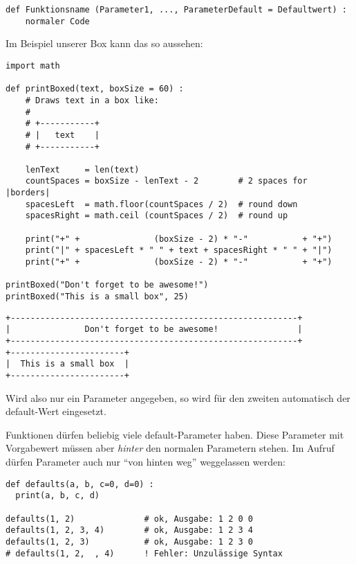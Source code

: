 \begin{codebox}
\begin{verbatim}
def Funktionsname (Parameter1, ..., ParameterDefault = Defaultwert) :
    normaler Code
\end{verbatim}
\end{codebox}

Im Beispiel unserer Box kann das so aussehen:

\begin{codebox}
\begin{verbatim}
import math

def printBoxed(text, boxSize = 60) :
    # Draws text in a box like:
    #
    # +-----------+
    # |   text    |
    # +-----------+
  
    lenText     = len(text)
    countSpaces = boxSize - lenText - 2        # 2 spaces for |borders|
    spacesLeft  = math.floor(countSpaces / 2)  # round down
    spacesRight = math.ceil (countSpaces / 2)  # round up
  
    print("+" +               (boxSize - 2) * "-"           + "+")
    print("|" + spacesLeft * " " + text + spacesRight * " " + "|")
    print("+" +               (boxSize - 2) * "-"           + "+")
  
printBoxed("Don't forget to be awesome!")
printBoxed("This is a small box", 25)
\end{verbatim}
\end{codebox}
\begin{cmdbox}
\begin{verbatim}
+----------------------------------------------------------+
|               Don't forget to be awesome!                |
+----------------------------------------------------------+
+-----------------------+
|  This is a small box  |
+-----------------------+
\end{verbatim}
\end{cmdbox}

Wird also nur ein Parameter angegeben, so wird für den zweiten automatisch der default-Wert  eingesetzt.

Funktionen dürfen beliebig viele default-Parameter haben. Diese Parameter mit Vorgabewert müssen aber \emph{hinter} den normalen Parametern stehen. Im Aufruf dürfen Parameter auch nur \enquote{von hinten weg} weggelassen werden:
\begin{codebox}
\begin{verbatim}
def defaults(a, b, c=0, d=0) :
  print(a, b, c, d)
  
defaults(1, 2)              # ok, Ausgabe: 1 2 0 0 
defaults(1, 2, 3, 4)        # ok, Ausgabe: 1 2 3 4
defaults(1, 2, 3)           # ok, Ausgabe: 1 2 3 0
# defaults(1, 2,  , 4)      ! Fehler: Unzulässige Syntax
\end{verbatim}
\end{codebox}

